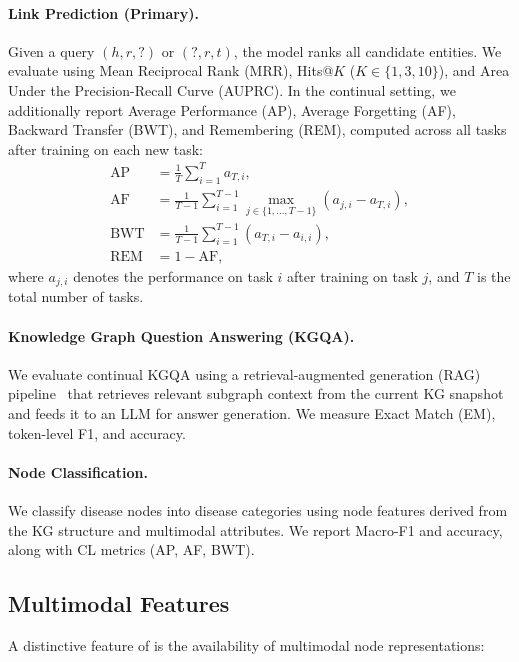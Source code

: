 \paragraph{Link Prediction (Primary).}
Given a query $(h, r, ?)$ or $(?, r, t)$, the model ranks all candidate entities.
We evaluate using Mean Reciprocal Rank (MRR), Hits@$K$ ($K \in \{1, 3, 10\}$), and Area Under the Precision-Recall Curve (AUPRC).
In the continual setting, we additionally report Average Performance (AP), Average Forgetting (AF), Backward Transfer (BWT), and Remembering (REM), computed across all tasks after training on each new task:
\begin{align}
    \text{AP} &= \frac{1}{T} \sum_{i=1}^{T} a_{T,i}, \label{eq:ap} \\
    \text{AF} &= \frac{1}{T-1} \sum_{i=1}^{T-1} \max_{j \in \{1,\ldots,T-1\}} (a_{j,i} - a_{T,i}), \label{eq:af} \\
    \text{BWT} &= \frac{1}{T-1} \sum_{i=1}^{T-1} (a_{T,i} - a_{i,i}), \label{eq:bwt} \\
    \text{REM} &= 1 - \text{AF}, \label{eq:rem}
\end{align}
where $a_{j,i}$ denotes the performance on task $i$ after training on task $j$, and $T$ is the total number of tasks.

\paragraph{Knowledge Graph Question Answering (KGQA).}
We evaluate continual KGQA using a retrieval-augmented generation (RAG) pipeline~\citep{Lewis2020} that retrieves relevant subgraph context from the current KG snapshot and feeds it to an LLM for answer generation.
We measure Exact Match (EM), token-level F1, and accuracy.

\paragraph{Node Classification.}
We classify disease nodes into disease categories using node features derived from the KG structure and multimodal attributes.
We report Macro-F1 and accuracy, along with CL metrics (AP, AF, BWT).

\subsection{Multimodal Features}
\label{sec:features}

A distinctive feature of \ours is the availability of multimodal node representations:

